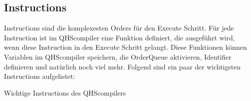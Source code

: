 \subsection{Instructions}
Instructions sind die komplexesten Orders für den Execute Schritt. Für jede Instruction ist im QHScompiler eine Funktion definiert, die ausgeführt wird, wenn diese Instruction in den Execute Schritt gelangt.
Diese Funktionen können Variablen im QHScompiler speichern, die OrderQueue aktivieren, Identifier definieren und natürlich noch viel mehr. Folgend sind ein paar der wichtigsten Instructions aufgelistet:

\begin{table}[H]
    \centering
    \caption{Wichtige Instructions des QHScompilers}
    \vspace{3mm} %
    

\end{table}
